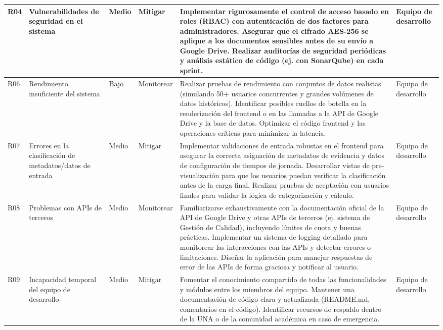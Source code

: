 \begin{longtable}{|l|p{}|l|l|p{}|p{}|}
    \hline
    R04 & Vulnerabilidades de seguridad en el sistema & Medio & Mitigar & Implementar rigurosamente el control de acceso basado en roles (RBAC) con autenticación de dos factores para administradores. Asegurar que el cifrado AES-256 se aplique a los documentos sensibles antes de su envío a Google Drive. Realizar auditorías de seguridad periódicas y análisis estático de código (ej. con SonarQube) en cada sprint. & Equipo de desarrollo \\
    \hline
    R06 & Rendimiento insuficiente del sistema & Bajo & Monitorear & Realizar pruebas de rendimiento con conjuntos de datos realistas (simulando 50+ usuarios concurrentes y grandes volúmenes de datos históricos). Identificar posibles cuellos de botella en la renderización del frontend o en las llamadas a la API de Google Drive y la base de datos. Optimizar el código frontend y las operaciones críticas para minimizar la latencia. & Equipo de desarrollo \\
    \hline
    R07 & Errores en la clasificación de metadatos/datos de entrada & Medio & Mitigar & Implementar validaciones de entrada robustas en el frontend para asegurar la correcta asignación de metadatos de evidencia y datos de configuración de tiempos de jornada. Desarrollar vistas de pre-visualización para que los usuarios puedan verificar la clasificación antes de la carga final. Realizar pruebas de aceptación con usuarios finales para validar la lógica de categorización y cálculo. & Equipo de desarrollo \\
    \hline
    R08 & Problemas con APIs de terceros & Medio & Monitorear & Familiarizarse exhaustivamente con la documentación oficial de la API de Google Drive y otras APIs de terceros (ej. sistema de Gestión de Calidad), incluyendo límites de cuota y buenas prácticas. Implementar un sistema de logging detallado para monitorear las interacciones con las APIs y detectar errores o limitaciones. Diseñar la aplicación para manejar respuestas de error de las APIs de forma graciosa y notificar al usuario. & Equipo de desarrollo \\
    \hline
    R09 & Incapacidad temporal del equipo de desarrollo & Medio & Mitigar & Fomentar el conocimiento compartido de todas las funcionalidades y módulos entre los miembros del equipo. Mantener una documentación de código clara y actualizada (README.md, comentarios en el código). Identificar recursos de respaldo dentro de la UNA o de la comunidad académica en caso de emergencia. & Equipo de desarrollo \\
    \hline

\end{longtable}

